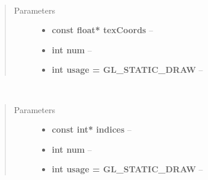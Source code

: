\documentclass[letterpaper,10pt,english]{sphinxmanual}
\begin{document}
\begin{fulllineitems}
\label{gl:VBO::setTexCoords__floatCP.i.i}~\begin{quote}\begin{description}
\item[{Parameters}] \leavevmode\begin{itemize}
\item {} 
\textbf{const float* texCoords} -- 

\item {} 
\textbf{int num} -- 

\item {} 
\textbf{int usage = GL\_STATIC\_DRAW} -- 

\end{itemize}

\end{description}\end{quote}

\end{fulllineitems}


\begin{fulllineitems}
\label{gl:VBO::setIndices__iCP.i.i}~\begin{quote}\begin{description}
\item[{Parameters}] \leavevmode\begin{itemize}
\item {} 
\textbf{const int* indices} -- 

\item {} 
\textbf{int num} -- 

\item {} 
\textbf{int usage = GL\_STATIC\_DRAW} -- 

\end{itemize}

\end{description}\end{quote}

\end{fulllineitems}

\end{document}

